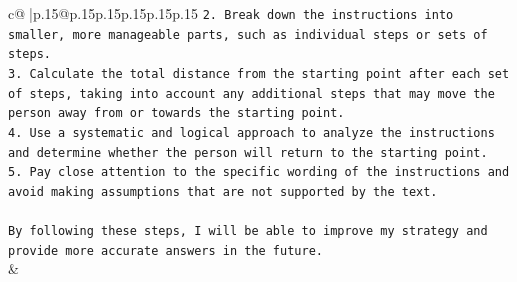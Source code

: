 \documentclass{article}
\begin{document}
{\begin{supertabular}{c@{$\;$}|p{.15\linewidth}@{}p{.15\linewidth}p{.15\linewidth}p{.15\linewidth}p{.15\linewidth}p{.15\linewidth}}
{{{\texttt{2. Break down the instructions into smaller, more manageable parts, such as individual steps or sets of steps.} \\
\texttt{3. Calculate the total distance from the starting point after each set of steps, taking into account any additional steps that may move the person away from or towards the starting point.} \\
\texttt{4. Use a systematic and logical approach to analyze the instructions and determine whether the person will return to the starting point.} \\
\texttt{5. Pay close attention to the specific wording of the instructions and avoid making assumptions that are not supported by the text.} \\
\\ 
\texttt{By following these steps, I will be able to improve my strategy and provide more accurate answers in the future.} \\
            }
        }
    }
    & \\ \\

\end{supertabular}
}
\end{document}
